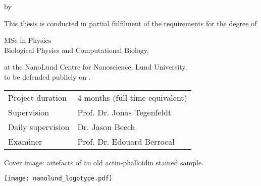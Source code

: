 {
\pagestyle{empty}


\begin{titlepage}
	
	\frutigerfont
	
	\begin{center}

		
		{\Huge \garamondfont \thetitle}
		
		\smallskip
		by
		\bigskip
		
		{\Large \garamondfont \theauthor}
		
		\bigskip
		\bigskip
		
		This thesis is conducted in partial fulfilment of the requirements for the degree of 
		
		\bigskip
		
		{MSc in Physics} \\
		Biological Physics and Computational Biology,
		
		\bigskip
		
		at the NanoLund Centre for Nanoscience, Lund University,\\
		to be defended publicly on .
		
		
		\vspace{5cm}
		
		\vfill
		\begin{tabular}{ll}
			Project duration & 4 months (full-time equivalent)\\
			Supervision & Prof. Dr. Jonas Tegenfeldt\\
			Daily supervision & Dr. Jason Beech\\
			Examiner & Prof. Dr. Edouard Berrocal
		\end{tabular}
	
		\bigskip
	
		Cover image: artefacts of an old actin-phalloidin stained sample.
	
		\vspace{2cm}
		
		\texttt{[image: nanolund\_logotype.pdf]}
	
	
	\end{center}
\end{titlepage}

%
%
%
%
%
%
%
%

}
